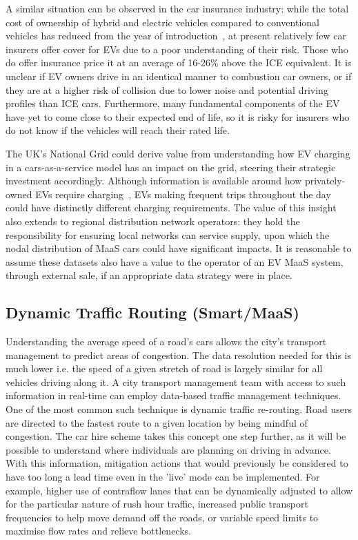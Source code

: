 \documentclass[b5paper,10pt]{article}
\begin{document}
A similar situation can be observed in the car insurance industry:
while the total cost of ownership of hybrid and electric vehicles
compared to conventional vehicles has reduced from the year of
introduction~\cite{palmer-et-al:2018}, at present relatively few car
insurers offer cover for EVs due to a poor understanding of their
risk. Those who do offer insurance price it at an average of 16-26\%
above the ICE equivalent. It is unclear if EV owners drive in an
identical manner to combustion car owners, or if they are at a higher
risk of collision due to lower noise and potential driving profiles
than ICE cars. Furthermore, many fundamental components of the EV have
yet to come close to their expected end of life, so it is risky for
insurers who do not know if the vehicles will reach their rated life.

The UK's National Grid could derive value from understanding how EV
charging in a cars-as-a-service model has an impact on the grid,
steering their strategic investment accordingly.  Although information
is available around how privately-owned EVs require
charging~\citep{kennel-et-al:2012,darabi+ferdowsi:2013}, EVs making
frequent trips throughout the day could have distinctly different
charging requirements. The value of this insight also extends to
regional distribution network operators: they hold the responsibility
for ensuring local networks can service supply, upon which the nodal
distribution of MaaS cars could have significant impacts. It is
reasonable to assume these datasets also have a value to the operator
of an EV MaaS system, through external sale, if an appropriate data
strategy were in place.

\subsection{Dynamic Traffic Routing (Smart/MaaS)} 

Understanding the average speed of a road's cars allows the city's
transport management to predict areas of congestion. The data
resolution needed for this is much lower i.e. the speed of a given
stretch of road is largely similar for all vehicles driving along
it. A city transport management team with access to such information
in real-time can employ data-based traffic management techniques. One
of the most common such technique is dynamic traffic re-routing. Road
users are directed to the fastest route to a given location by being
mindful of congestion. The car hire scheme takes this concept one step
further, as it will be possible to understand where individuals are
planning on driving in advance. With this information, mitigation
actions that would previously be considered to have too long a lead
time even in the 'live' mode can be implemented. For example, higher
use of contraflow lanes that can be dynamically adjusted to allow for
the particular nature of rush hour traffic, increased public
transport frequencies to help move demand off the roads, or variable
speed limits to maximise flow rates and relieve bottlenecks.
\end{document}
